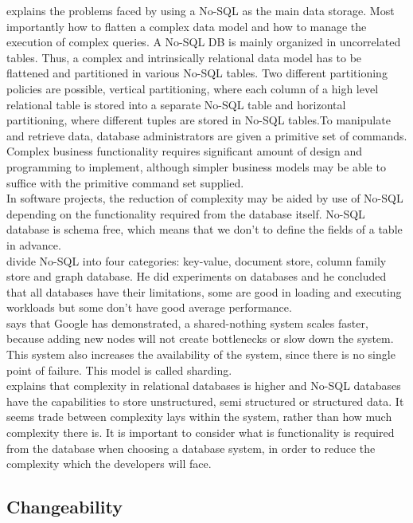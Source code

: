 \documentclass{article} %
\begin{document}
\cite{lombardo2012issues} explains the problems faced by using a No-SQL as the main
data storage. Most importantly how to flatten a complex data model
and how to manage the execution of complex queries.
A No-SQL DB is mainly organized in uncorrelated tables.
Thus, a complex and intrinsically relational data model has
to be flattened and partitioned in various No-SQL tables.
Two different partitioning policies are possible, vertical
partitioning, where each column of a high level relational
table is stored into a separate No-SQL table and horizontal
partitioning, where different tuples are stored in 
No-SQL tables.To manipulate and retrieve data,
database administrators are given a primitive set of
commands. Complex business functionality requires
significant amount of design and programming to
implement, although simpler business models may
be able to suffice with the primitive command set
supplied.\\
In software projects, the reduction of complexity may
be aided by use of No-SQL depending on
the functionality required from the database itself. No-SQL database is schema free, which 
means that we don't to define the fields of a table in advance. \\
\cite{tang2016performance} divide No-SQL into four categories: key-value, document store,
column family store and graph database. He did experiments on databases and he concluded that all databases have their limitations, some are good in loading and executing workloads but some don't have good average performance.\\
\cite{burtica2012practical} says that Google has demonstrated, a shared-nothing system scales faster, 
because adding new nodes will not create bottlenecks or slow down the system.
This system also increases the availability of the system, since there is no
single point of failure. This model is called sharding.\\
\cite{mohamed2014relational} explains that complexity in relational databases is higher and 
No-SQL databases have the capabilities to store unstructured, semi structured or structured data.
It seems trade between 
complexity lays within the system, rather than how
much complexity there is. It is important to consider
what is functionality is required from the database
when choosing a database system, in order to reduce
the complexity which the developers will face.

\subsection{Changeability}
\end{document}
